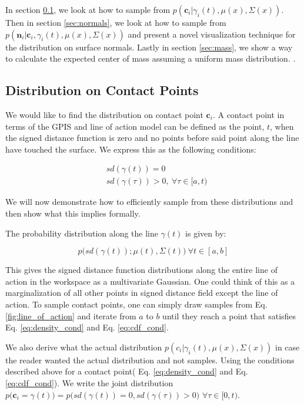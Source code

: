 \documentclass[letterpaper, 10 pt, conference]{ieeeconf}  %
\begin{document}
 In section \ref{sec:contact}, we look at how to sample from $p(\textbf{c}_i|\gamma_i(t),\mu(x),\Sigma(x))$. Then in section \ref{sec:normals}, we look at how to sample from $p(\textbf{n}_i|\textbf{c}_i,\gamma_i(t),\mu(x),\Sigma(x))$ and present a novel visualization technique for the distribution on surface normals. Lastly in section \ref{sec:mass}, we show a way to calculate the expected center of mass assuming a uniform mass distribution. 
 .
\subsection{Distribution on Contact Points}\label{sec:contact} 
We would like to find the distribution on contact point $\textbf{c}_i$. A contact point in terms of the GPIS and line of action model can be defined as the point, $t$, when the signed distance function is zero and no points before said point along the line have touched the surface. We express this as the following conditions: 

\vspace{-2ex}
\begin{align}
 &sd(\gamma(t)) = 0 \label{eq:density_cond} \\
&sd(\gamma(\tau)) > 0, \: \forall \tau \in [a,t) \label{eq:cdf_cond}
\end{align}

We will now demonstrate how to efficiently sample from these distributions and then show what this implies formally. 

The probability distribution along the line $\gamma(t)$ is given by:

\vspace{-2ex}
\begin{equation} \label{eq:line_of_act_dist}
p\big(sd(\gamma(t)) ; \mu(t),\Sigma(t)\big) \ \forall t \in [a,b] 
\end{equation}

This gives the signed distance function distributions along the entire line of action in the workspace as a multivariate Gaussian. One could think of this as a marginalization of all other points in signed distance field except the line of action. To sample contact points, one can simply draw samples from Eq. \ref{fig:line_of_action} and iterate from $a$ to $b$ until they reach a point that satisfies  Eq. \ref{eq:density_cond} and Eq. \ref{eq:cdf_cond}. 

We also derive what the actual distribution $p(c_i|\gamma_i(t),\mu(x),\Sigma(x))$ in case the reader wanted the actual distribution and not samples. Using the conditions described above for a contact point( Eq. \ref{eq:density_cond} and Eq. \ref{eq:cdf_cond}).  We write the joint distribution $p\big( \textbf{c}_i= \gamma(t)\big) = p\big(sd(\gamma(t))=0, sd(\gamma(\tau))> 0 \big)$ $  \forall \tau \in [0,t)$.
\end{document}
